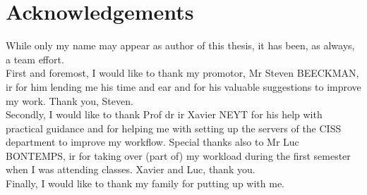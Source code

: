 \chapter*{Acknowledgements}
While only my name may appear as author of this thesis, it has been, as always, a team effort.\\
First and foremost, I would like to thank my promotor, Mr Steven BEECKMAN, ir for him lending me his time and ear and for his valuable suggestions to improve my work. Thank you, Steven.\\
Secondly, I would like to thank Prof dr ir  Xavier NEYT for his help with practical guidance and for helping me with setting up the servers of the CISS department to improve my workflow. Special thanks also to Mr Luc BONTEMPS, ir for taking over (part of) my workload during the first semester when I was attending classes. Xavier and Luc, thank you.\\
Finally, I would like to thank my family for putting up with me.

